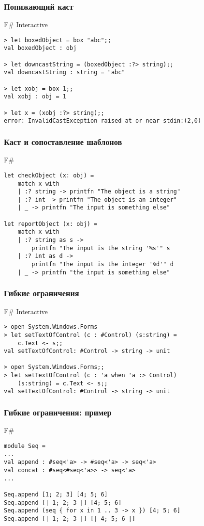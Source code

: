 \documentclass[xetex,mathserif,serif]{beamer}
\begin{document}
	\begin{frame}[fragile]
		\frametitle{Понижающий каст}
\begin{alertblock}{F\# Interactive}
\begin{lstlisting}[keywordstyle=\color{black}]
> let boxedObject = box "abc";;
val boxedObject : obj

> let downcastString = (boxedObject :?> string);;
val downcastString : string = "abc"

> let xobj = box 1;;
val xobj : obj = 1

> let x = (xobj :?> string);;
error: InvalidCastException raised at or near stdin:(2,0)
\end{lstlisting}
\end{alertblock}
\end{frame}

	\begin{frame}[fragile]
		\frametitle{Каст и сопоставление шаблонов}
		\begin{exampleblock}{F\#}
			\begin{lstlisting}
let checkObject (x: obj) =
    match x with
    | :? string -> printfn "The object is a string"
    | :? int -> printfn "The object is an integer"
    | _ -> printfn "The input is something else"

let reportObject (x: obj) =
    match x with
    | :? string as s -> 
        printfn "The input is the string '%s'" s
    | :? int as d -> 
        printfn "The input is the integer '%d'" d
    | _ -> printfn "the input is something else"
\end{lstlisting}
\end{exampleblock}
\end{frame}

	\begin{frame}[fragile]
		\frametitle{Гибкие ограничения}
\begin{alertblock}{F\# Interactive}
\begin{lstlisting}[keywordstyle=\color{black}]
> open System.Windows.Forms
> let setTextOfControl (c : #Control) (s:string) = 
    c.Text <- s;;
val setTextOfControl: #Control -> string -> unit

> open System.Windows.Forms;;
> let setTextOfControl (c : 'a when 'a :> Control) 
    (s:string) = c.Text <- s;;
val setTextOfControl: #Control -> string -> unit
\end{lstlisting}
\end{alertblock}
\end{frame}

	\begin{frame}[fragile]
		\frametitle{Гибкие ограничения: пример}
		\begin{exampleblock}{F\#}
			\begin{lstlisting}
module Seq =
...
val append : #seq<'a> -> #seq<'a> -> seq<'a>
val concat : #seq<#seq<'a>> -> seq<'a>
...

Seq.append [1; 2; 3] [4; 5; 6]
Seq.append [| 1; 2; 3 |] [4; 5; 6]
Seq.append (seq { for x in 1 .. 3 -> x }) [4; 5; 6]
Seq.append [| 1; 2; 3 |] [| 4; 5; 6 |]
\end{lstlisting}
\end{exampleblock}
\end{frame}
\end{document}
